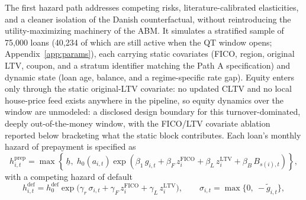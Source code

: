 \documentclass[12pt]{article}
\begin{document}
The first hazard path addresses competing risks, literature-calibrated elasticities, and a cleaner isolation of the Danish counterfactual, without reintroducing the utility-maximizing machinery of the ABM. It simulates a stratified sample of 75,000 loans (40,234 of which are still active when the QT window opens; Appendix~\ref{app:params}), each carrying static covariates (FICO, region, original LTV, coupon, and a stratum identifier matching the Path A specification) and dynamic state (loan age, balance, and a regime-specific rate gap). Equity enters only through the static original-LTV covariate: no updated CLTV and no local house-price feed exists anywhere in the pipeline, so equity dynamics over the window are unmodeled: a disclosed design boundary for this turnover-dominated, deeply out-of-the-money window, with the FICO/LTV covariate ablation reported below bracketing what the static block contributes. Each loan's monthly hazard of prepayment is specified as
\begin{equation}\label{eq:pathB}
h^{\mathrm{prep}}_{i,t} = \max\!\left\{\, \underline{h},\; h_0\!\left(a_{i,t}\right) \exp\!\left( \beta_1\, g_{i,t} + \beta_F\, z^{\mathrm{FICO}}_{i} + \beta_L\, z^{\mathrm{LTV}}_{i} + \beta_B\, B_{s(i),t} \right) \right\},
\end{equation}
with a competing hazard of default
\begin{equation}\label{eq:default}
h^{\mathrm{def}}_{i,t} = h^{\mathrm{def}}_0 \exp\!\big( \gamma_r\, \sigma_{i,t} + \gamma_F\, z^{\mathrm{FICO}}_{i} + \gamma_L\, z^{\mathrm{LTV}}_{i} \big), \qquad \sigma_{i,t} = \max\{0,\ -\tilde g_{i,t}\},
\end{equation}
\end{document}
